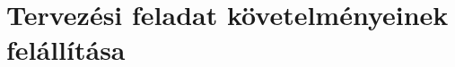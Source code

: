 \documentclass[../main.tex]{subfiles}
\begin{document}
\section{Tervezési feladat követelményeinek felállítása}
\end{document}
